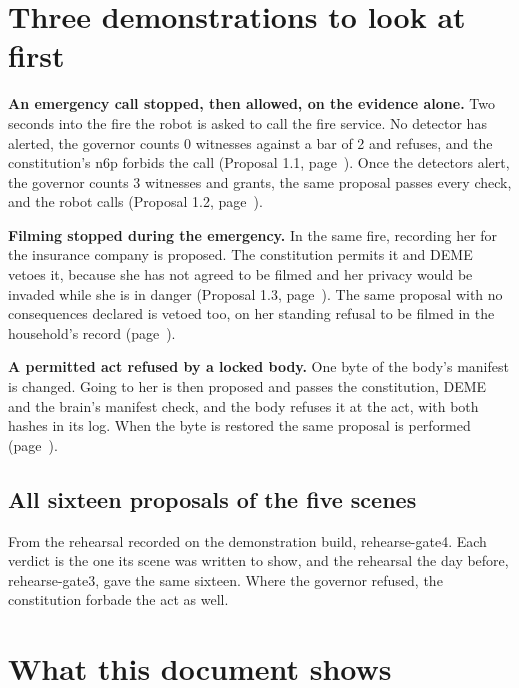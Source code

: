 \documentclass[11pt]{article}
\begin{document}
\clearpage
\section*{Three demonstrations to look at first}

{\small
\textbf{An emergency call stopped, then allowed, on the evidence alone.} Two seconds into the fire
the robot is asked to call the fire service. No detector has alerted, the governor counts 0
witnesses against a bar of 2 and refuses, and the constitution's n6p forbids the call
(Proposal 1.1, page~\pageref{prop1.1}). Once the detectors alert, the governor counts 3 witnesses
and grants, the same proposal passes every check, and the robot calls (Proposal 1.2,
page~\pageref{prop1.2}).

\textbf{Filming stopped during the emergency.} In the same fire, recording her for the insurance
company is proposed. The constitution permits it and DEME vetoes it, because she has not agreed to
be filmed and her privacy would be invaded while she is in danger (Proposal 1.3,
page~\pageref{prop1.3}). The same proposal with no consequences declared is vetoed too, on her
standing refusal to be filmed in the household's record (page~\pageref{sec:cf}).

\textbf{A permitted act refused by a locked body.} One byte of the body's manifest is changed.
Going to her is then proposed and passes the constitution, DEME and the brain's manifest check,
and the body refuses it at the act, with both hashes in its log. When the byte is restored the same
proposal is performed (page~\pageref{sec:c11}).\par}

\subsection*{All sixteen proposals of the five scenes}\label{matrix}

From the rehearsal recorded on the demonstration build, rehearse-gate4. Each verdict is the one
its scene was written to show, and the rehearsal the day before, rehearse-gate3, gave the same
sixteen. Where the governor refused, the constitution forbade the act as well.



\clearpage
\section*{What this document shows}
\end{document}

